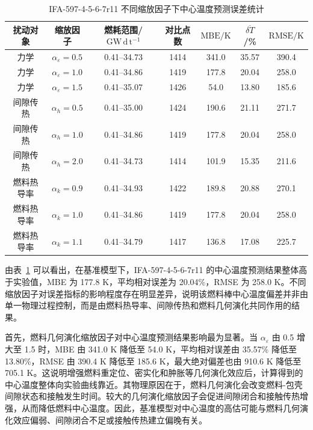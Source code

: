 \begin{table}[htbp]
	\centering
	\caption{IFA-597-4-5-6-7r11 不同缩放因子下中心温度预测误差统计}
	\label{tab:ifa597r11_temperature_alpha_sensitivity_error}
	\begin{tabular*}{\textwidth}{
			@{\extracolsep{\fill}}
			ccccccc
			@{}
		}
		\toprule
		\multicolumn{1}{c}{扰动对象} & \multicolumn{1}{c}{缩放因子} & 燃耗范围/$\mathrm{GW\,d\,t^{-1}}$ & 对比点数 & $\mathrm{MBE}/\mathrm{K}$ & $\overline{\delta T}$/\% & $\mathrm{RMSE}/\mathrm{K}$ \\
		\midrule
		力学 & $\alpha_{\varepsilon}=0.5$ & 0.41--34.73 & 1414 & 341.0 & 35.57 & 390.4 \\
		力学 & $\alpha_{\varepsilon}=1.0$ & 0.41--34.86 & 1419 & 177.8 & 20.04 & 258.0 \\
		力学 & $\alpha_{\varepsilon}=1.5$ & 0.41--35.07 & 1426 & 54.0 & 13.80 & 185.6 \\
		间隙传热 & $\alpha_h=0.5$ & 0.41--35.00 & 1424 & 190.6 & 21.11 & 271.7 \\
		间隙传热 & $\alpha_h=1.0$ & 0.41--34.86 & 1419 & 177.8 & 20.04 & 258.0 \\
		间隙传热 & $\alpha_h=2.0$ & 0.41--34.73 & 1414 & 101.9 & 15.35 & 211.6 \\
		燃料热导率 & $\alpha_k=0.9$ & 0.41--34.93 & 1422 & 189.8 & 20.88 & 270.1 \\
		燃料热导率 & $\alpha_k=1.0$ & 0.41--34.86 & 1419 & 177.8 & 20.04 & 258.0 \\
		燃料热导率 & $\alpha_k=1.1$ & 0.41--34.79 & 1417 & 136.8 & 17.08 & 225.7 \\
		\bottomrule
	\end{tabular*}
\end{table}

由表~\ref{tab:ifa597r11_temperature_alpha_sensitivity_error} 可以看出，在基准模型下，IFA-597-4-5-6-7r11 的中心温度预测结果整体高于实验值，MBE 为 177.8 K，平均相对误差为 20.04\%，RMSE 为 258.0 K。不同缩放因子对误差指标的影响程度存在明显差异，说明该燃料棒中心温度偏差并非由单一物理过程控制，而是由燃料热导率、间隙传热和燃料几何演化共同作用的结果。

首先，燃料几何演化缩放因子对中心温度预测结果影响最为显著。当 \(\alpha_{\varepsilon}\) 由 0.5 增大至 1.5 时，MBE 由 341.0 K 降低至 54.0 K，平均相对误差由 35.57\% 降低至 13.80\%，RMSE 由 390.4 K 降低至 185.6 K，最大绝对偏差也由 910.6 K 降低至 705.1 K。这说明增强燃料重定位、密实化和肿胀等几何演化效应后，计算得到的中心温度整体向实验曲线靠近。其物理原因在于，燃料几何演化会改变燃料-包壳间隙状态和接触发生时间。较大的几何演化缩放因子会促进间隙闭合和接触传热增强，从而降低燃料中心温度。因此，基准模型对中心温度的高估可能与燃料几何演化效应偏弱、间隙闭合不足或接触传热建立偏晚有关。

